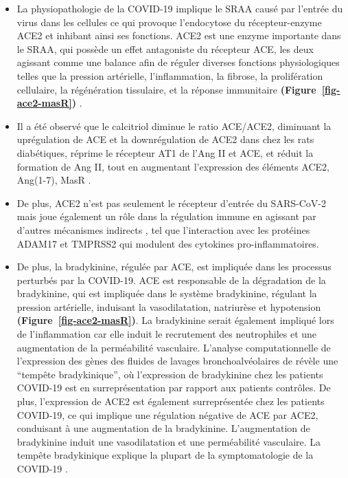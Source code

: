 \documentclass[
  a4paper,
  DIV=11,
  numbers=noendperiod,
  listof=totoc]{scrreprt}
\begin{document}
\begin{itemize}
\item
  La physiopathologie de la COVID-19 implique le \ac{SRAA} causé par
  l'entrée du virus dans les cellules ce qui provoque l'endocytose du
  récepteur-enzyme ACE2 et inhibant ainsi ses fonctions. ACE2 est une
  enzyme importante dans le \ac{SRAA}, qui possède un effet antagoniste
  du récepteur ACE, les deux agissant comme une balance afin de réguler
  diverses fonctions physiologiques telles que la pression artérielle,
  l'inflammation, la fibrose, la prolifération cellulaire, la
  régénération tissulaire, et la réponse immunitaire
  \textbf{(Figure~\ref{fig-ace2-masR})} \autocite{Brojakowska.2020}.
\item
  Il a été observé que le calcitriol diminue le ratio ACE/ACE2,
  diminuant la uprégulation de ACE et la downrégulation de ACE2 dans
  chez les rats diabétiques, réprime le récepteur AT1 de l'Ang II et
  ACE, et réduit la formation de Ang II, tout en augmentant l'expression
  des éléments ACE2, Ang(1-7), MasR \autocite{Mahdavi.2020}.
\item
  De plus, ACE2 n'est pas seulement le récepteur d'entrée du SARS-CoV-2
  mais joue également un rôle dans la régulation immune en agissant par
  d'autres mécanismes indirects \autocites[ ]{Argano.2023}{Zipeto.2020},
  tel que l'interaction avec les protéines ADAM17 et TMPRSS2 qui
  modulent des cytokines pro-inflammatoires.
\item
  De plus, la bradykinine, régulée par ACE, est impliquée dans les
  processus perturbés par la COVID-19. ACE est responsable de la
  dégradation de la bradykinine, qui est impliquée dans le système
  bradykinine, régulant la pression artérielle, induisant la
  vasodilatation, natriurèse et hypotension
  \textbf{(Figure~\ref{fig-ace2-masR})}. La bradykinine serait également
  impliqué lors de l'inflammation car elle induit le recrutement des
  neutrophiles et une augmentation de la perméabilité vasculaire.
  L'analyse computationnelle de l'expression des gènes des fluides de
  lavages bronchoalvéolaires de \textcite{Garvin.2020} révèle une
  ``tempête bradykinique'', où l'expression de bradykinine chez les
  patients COVID-19 est en surreprésentation par rapport aux patients
  contrôles. De plus, l'expression de ACE2 est également surreprésentée
  chez les patients COVID-19, ce qui implique une régulation négative de
  ACE par ACE2, conduisant à une augmentation de la bradykinine.
  L'augmentation de bradykinine induit une vasodilatation et une
  perméabilité vasculaire. La tempête bradykinique explique la plupart
  de la symptomatologie de la COVID-19 \autocite{Garvin.2020}.
\end{itemize}
\end{document}
